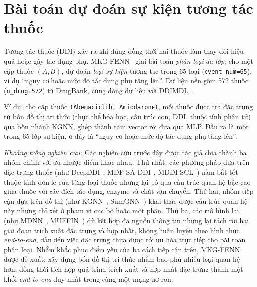 \documentclass[conference]{IEEEtran}
\renewcommand{\hl}[1]{#1}
\renewcommand{\colorbox}[2]{#2}
\begin{document}
\section{Bài toán dự đoán sự kiện tương tác thuốc}
\label{sec:fenn-problem}

Tương tác thuốc (DDI) xảy ra khi dùng đồng thời hai thuốc làm thay đổi
hiệu quả hoặc gây tác dụng phụ. MKG-FENN~\cite{mkgfenn} giải bài toán
\emph{phân loại đa lớp}: cho một cặp thuốc $(A, B)$, dự đoán \emph{loại sự kiện}
tương tác trong 65 loại (\texttt{event\_num=65}), ví dụ ``nguy cơ hoặc mức độ tác
dụng phụ tăng lên''. Dữ liệu nền gồm 572 thuốc (\texttt{n\_drug=572}) từ DrugBank,
cùng dòng dữ liệu với DDIMDL~\cite{ddimdl}.

\hl{Ví dụ:} cho cặp thuốc \texttt{(Abemaciclib, Amiodarone)},
mỗi thuốc được tra đặc trưng từ bốn đồ thị tri thức (thực thể hóa học, cấu trúc con,
DDI, thuộc tính phân tử) qua bốn nhánh KGNN, ghép thành tám vector rồi đưa qua MLP.
Đầu ra là một trong 65 lớp sự kiện, ở đây là \hl{``nguy cơ hoặc mức độ tác dụng phụ tăng
lên''.}

\textit{Khoảng trống nghiên cứu:} \hl{Các nghiên cứu trước đây được tác giả chia thành ba nhóm chính với ưu nhược điểm khác nhau. Thứ nhất, các phương pháp dựa trên đặc trưng thuốc (như DeepDDI}~\colorbox{yellow}{\cite{deepddi}}\hl{, MDF-SA-DDI}~\colorbox{yellow}{\cite{mdfsaddi}}\hl{, MDDI-SCL}~\colorbox{yellow}{\cite{mddiscl}}\hl{) nắm bắt tốt thuộc tính đơn lẻ của từng loại thuốc nhưng lại bỏ qua cấu trúc quan hệ bậc cao giữa thuốc với các đích tác dụng, enzyme và chất vận chuyển. Thứ hai, nhóm tiếp cận dựa trên đồ thị (như KGNN}~\colorbox{yellow}{\cite{kgnn}}\hl{, SumGNN}~\colorbox{yellow}{\cite{sumgnn}}\hl{) khai thác được cấu trúc quan hệ này nhưng chỉ xét ở phạm vi cục bộ hoặc một phần. Thứ ba, các mô hình lai (như MDNN}~\colorbox{yellow}{\cite{mdnn}}\hl{, MUFFIN}~\colorbox{yellow}{\cite{muffin}}\hl{) dù kết hợp đa nguồn thông tin nhưng lại tách rời hai giai đoạn trích xuất đặc trưng và hợp nhất, không huấn luyện theo hình thức} \colorbox{yellow}{\emph{end-to-end}}\hl{, dẫn đến việc đặc trưng chưa được tối ưu hóa trực tiếp cho bài toán phân loại. Nhằm khắc phục điểm yếu của ba cách tiếp cận trên, MKG-FENN được đề xuất: xây dựng bốn đồ thị tri thức nhằm bao phủ nhiều loại quan hệ hơn, đồng thời tích hợp quá trình trích xuất và hợp nhất đặc trưng thành một khối} \colorbox{yellow}{\emph{end-to-end}} \hl{duy nhất trong cùng một mạng nơ-ron.}
\end{document}
